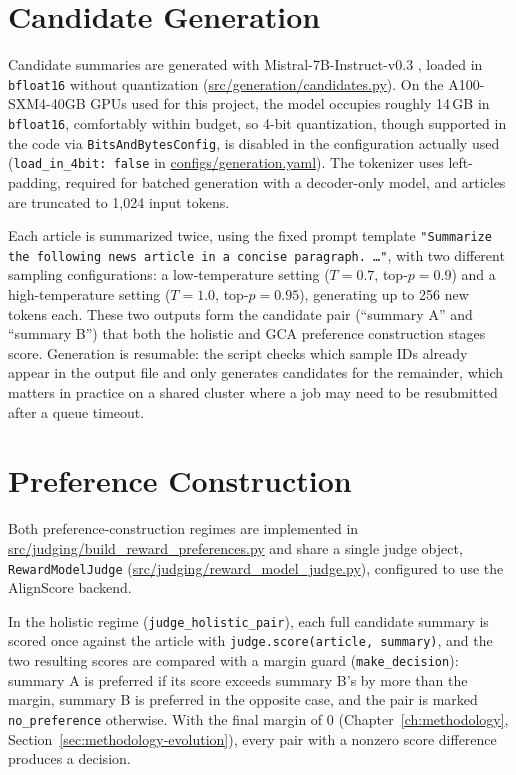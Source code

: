 \section{Candidate Generation}
\label{sec:impl-generation}

Candidate summaries are generated with Mistral-7B-Instruct-v0.3
\citep{jiang2023mistral}, loaded in \texttt{bfloat16} without quantization (\url{src/generation/candidates.py}). On the
A100-SXM4-40GB GPUs used for this project, the model occupies roughly 14\,GB in
\texttt{bfloat16}, comfortably within budget, so 4-bit quantization, though
supported in the code via \texttt{BitsAndBytesConfig}, is disabled in the
configuration actually used (\texttt{load\_in\_4bit: false} in
\url{configs/generation.yaml}). The tokenizer uses left-padding, required for
batched generation with a decoder-only model, and articles are truncated to 1{,}024
input tokens.

Each article is summarized twice, using the fixed prompt template
\texttt{"Summarize the following news article in a concise paragraph.\ \ldots"},
with two different sampling configurations: a low-temperature setting
($T=0.7$, top-$p=0.9$) and a high-temperature setting ($T=1.0$, top-$p=0.95$),
generating up to 256 new tokens each. These two outputs form the candidate pair
(``summary A'' and ``summary B'') that both the holistic and GCA preference
construction stages score. Generation is resumable: the script checks which
sample IDs already appear in the output file and only generates candidates for the
remainder, which matters in practice on a shared cluster where a job may need to be
resubmitted after a queue timeout.

\section{Preference Construction}
\label{sec:impl-preferences}

Both preference-construction regimes are implemented in
\url{src/judging/build_reward_preferences.py} and share a single judge object,
\texttt{RewardModelJudge} (\url{src/judging/reward_model_judge.py}), configured to
use the AlignScore backend.

In the holistic regime (\texttt{judge\_holistic\_pair}), each full candidate
summary is scored once against the article with \texttt{judge.score(article,\
summary)}, and the two resulting scores are compared with a margin guard
(\texttt{make\_decision}): summary A is preferred if its score exceeds summary B's
by more than the margin, summary B is preferred in the opposite case, and the pair
is marked \texttt{no\_preference} otherwise. With the final margin of 0
(Chapter~\ref{ch:methodology}, Section~\ref{sec:methodology-evolution}), every
pair with a nonzero score
difference produces a decision.

